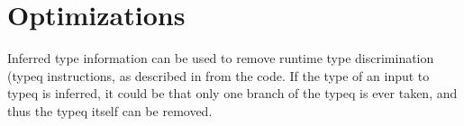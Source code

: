 \section{Optimizations}

Inferred type information can be used to remove runtime type
discrimination (typeq instructions, as described in 
from the code. If the type of an input to typeq is inferred, it could
be that only one branch of the typeq is ever taken, and thus the typeq
itself can be removed.
